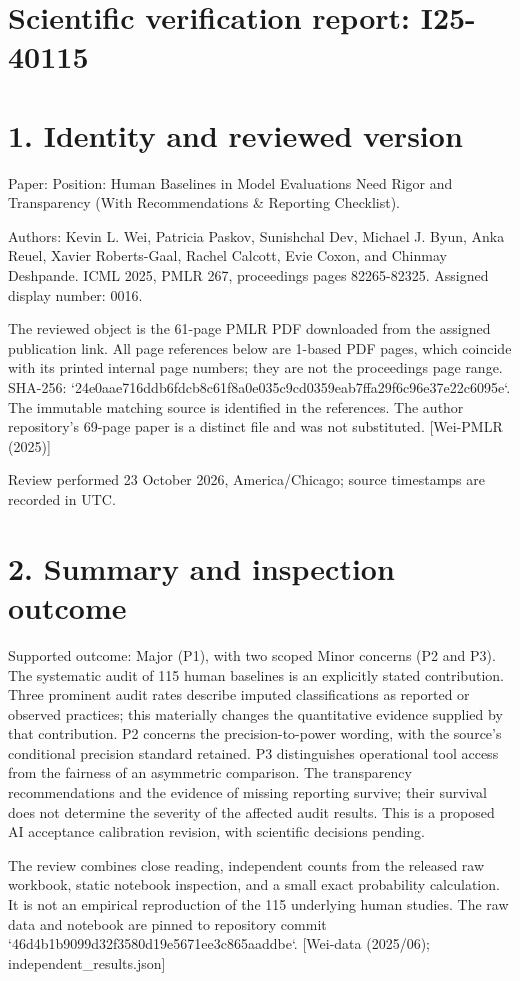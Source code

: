 \documentclass[10pt]{article}
\begin{document}
\section*{Scientific verification report: I25-40115}
\section*{1. Identity and reviewed version}
Paper: Position: Human Baselines in Model Evaluations Need Rigor and Transparency (With Recommendations \& Reporting Checklist).\par
Authors: Kevin L. Wei, Patricia Paskov, Sunishchal Dev, Michael J. Byun, Anka Reuel, Xavier Roberts-Gaal, Rachel Calcott, Evie Coxon, and Chinmay Deshpande. ICML 2025, PMLR 267, proceedings pages 82265-82325. Assigned display number: 0016.\par
The reviewed object is the 61-page PMLR PDF downloaded from the assigned publication link. All page references below are 1-based PDF pages, which coincide with its printed internal page numbers; they are not the proceedings page range. SHA-256: `24e0aae716ddb6fdcb8c61f8a0e035c9cd0359eab7ffa29f6c96e37e22c6095e`. The immutable matching source is identified in the references. The author repository’s 69-page paper is a distinct file and was not substituted. [Wei-PMLR (2025)]\par
Review performed 23 October 2026, America/Chicago; source timestamps are recorded in UTC.\par
\section*{2. Summary and inspection outcome}
Supported outcome: Major (P1), with two scoped Minor concerns (P2 and P3). The systematic audit of 115 human baselines is an explicitly stated contribution. Three prominent audit rates describe imputed classifications as reported or observed practices; this materially changes the quantitative evidence supplied by that contribution. P2 concerns the precision-to-power wording, with the source’s conditional precision standard retained. P3 distinguishes operational tool access from the fairness of an asymmetric comparison. The transparency recommendations and the evidence of missing reporting survive; their survival does not determine the severity of the affected audit results. This is a proposed AI acceptance calibration revision, with scientific decisions pending.\par
The review combines close reading, independent counts from the released raw workbook, static notebook inspection, and a small exact probability calculation. It is not an empirical reproduction of the 115 underlying human studies. The raw data and notebook are pinned to repository commit `46d4b1b9099d32f3580d19e5671ee3c865aaddbe`. [Wei-data (2025/06); independent\_results.json]\par
\end{document}
